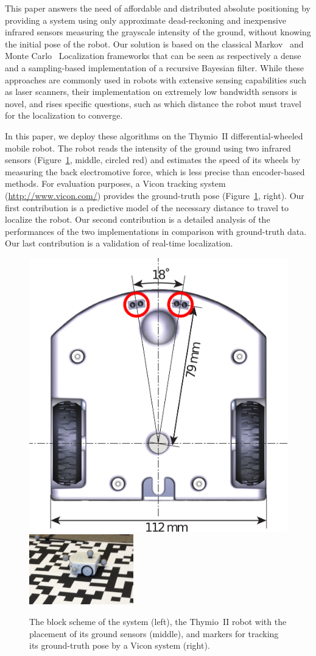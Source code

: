 \documentclass{svmult}
\newcommand{\fig}[1]{Figure~\ref{fig:#1}}
\begin{document}
This paper answers the need of affordable and distributed absolute positioning by providing a system using only approximate dead-reckoning and inexpensive infrared sensors measuring the grayscale intensity of the ground, without knowing the initial pose of the robot.
Our solution is based on the classical Markov~\cite{fox1999markov} and Monte Carlo~\cite{dellaert1999monte} Localization frameworks that can be seen as respectively a dense and a sampling-based implementation of a recursive Bayesian filter.
While these approaches are commonly used in robots with extensive sensing capabilities such as laser scanners, their implementation on extremely low bandwidth sensors is novel, and rises specific questions, such as which distance the robot must travel for the localization to converge.

In this paper, we deploy these algorithms on the Thymio~II differential-wheeled mobile robot.
The robot reads the intensity of the ground using two infrared sensors (\fig{thymio}, middle, circled red) and estimates the speed of its wheels by measuring the back electromotive force, which is less precise than encoder-based methods.
For evaluation purposes, a Vicon tracking system (\url{http://www.vicon.com/}) provides the ground-truth pose (\fig{thymio}, right).
Our first contribution is a predictive model of the necessary distance to travel to localize the robot.
Our second contribution is a detailed analysis of the performances of the two implementations in comparison with ground-truth data.
Our last contribution is a validation of real-time localization.

\begin{figure}
\includegraphics[height=.27\columnwidth]{thymio2-dimensions}\hfill
\includegraphics[height=.27\columnwidth]{thymio2-dataset}
\vspace{-.07cm}
\caption{The block scheme of the system (left), the Thymio~II robot with the placement of its ground sensors (middle), and markers for tracking its ground-truth pose by a Vicon system (right).}
\label{fig:thymio}
\end{figure}
\end{document}
